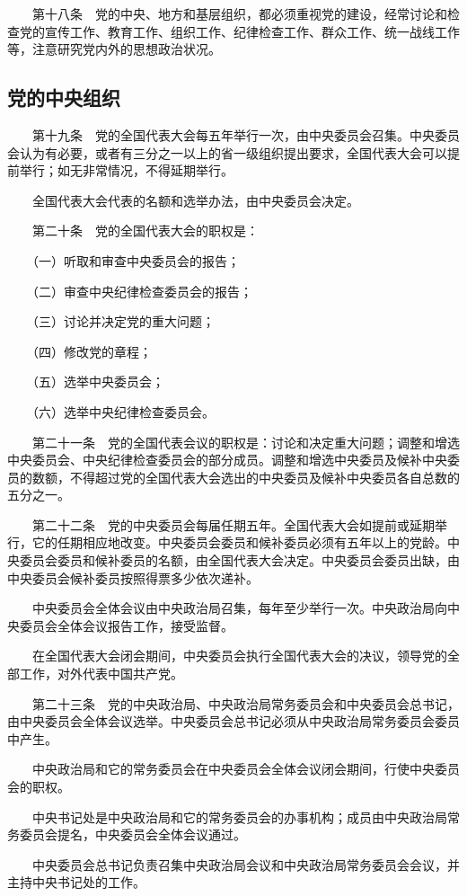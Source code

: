 　　第十八条　党的中央、地方和基层组织，都必须重视党的建设，经常讨论和检查党的宣传工作、教育工作、组织工作、纪律检查工作、群众工作、统一战线工作等，注意研究党内外的思想政治状况。

    \subsection{党的中央组织}
　　第十九条　党的全国代表大会每五年举行一次，由中央委员会召集。中央委员会认为有必要，或者有三分之一以上的省一级组织提出要求，全国代表大会可以提前举行；如无非常情况，不得延期举行。

　　全国代表大会代表的名额和选举办法，由中央委员会决定。

　　第二十条　党的全国代表大会的职权是：

　　（一）听取和审查中央委员会的报告；

　　（二）审查中央纪律检查委员会的报告；

　　（三）讨论并决定党的重大问题；

　　（四）修改党的章程；

　　（五）选举中央委员会；

　　（六）选举中央纪律检查委员会。

　　第二十一条　党的全国代表会议的职权是：讨论和决定重大问题；调整和增选中央委员会、中央纪律检查委员会的部分成员。调整和增选中央委员及候补中央委员的数额，不得超过党的全国代表大会选出的中央委员及候补中央委员各自总数的五分之一。

　　第二十二条　党的中央委员会每届任期五年。全国代表大会如提前或延期举行，它的任期相应地改变。中央委员会委员和候补委员必须有五年以上的党龄。中央委员会委员和候补委员的名额，由全国代表大会决定。中央委员会委员出缺，由中央委员会候补委员按照得票多少依次递补。

　　中央委员会全体会议由中央政治局召集，每年至少举行一次。中央政治局向中央委员会全体会议报告工作，接受监督。

　　在全国代表大会闭会期间，中央委员会执行全国代表大会的决议，领导党的全部工作，对外代表中国共产党。

　　第二十三条　党的中央政治局、中央政治局常务委员会和中央委员会总书记，由中央委员会全体会议选举。中央委员会总书记必须从中央政治局常务委员会委员中产生。

　　中央政治局和它的常务委员会在中央委员会全体会议闭会期间，行使中央委员会的职权。

　　中央书记处是中央政治局和它的常务委员会的办事机构；成员由中央政治局常务委员会提名，中央委员会全体会议通过。

　　中央委员会总书记负责召集中央政治局会议和中央政治局常务委员会会议，并主持中央书记处的工作。

